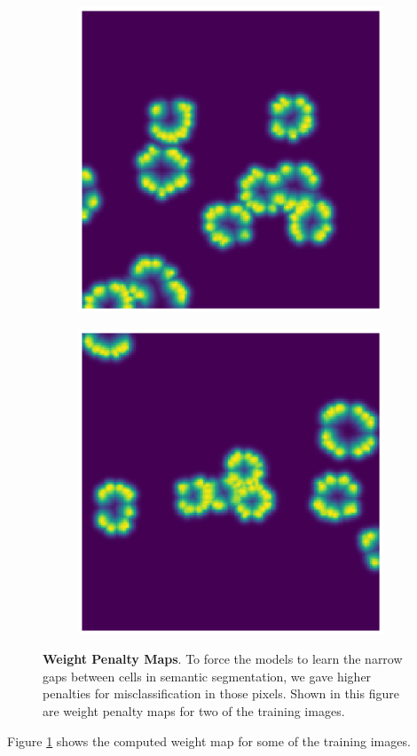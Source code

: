 \documentclass[10pt, journal, compsoc]{IEEEtran}
\begin{document}
\begin{figure}
\begin{subfigure}[b]{0.45\linewidth}
\end{subfigure}
\begin{subfigure}[b]{0.45\linewidth}
\includegraphics[width=\linewidth]{weights/108641-wmap.eps}
\end{subfigure}
\begin{subfigure}[b]{0.45\linewidth}
\includegraphics[width=\linewidth]{weights/108681-wmap.eps}
\end{subfigure}
\caption{\textbf{Weight Penalty Maps}. To force the models to learn the narrow gaps between cells in semantic segmentation, we gave higher penalties for misclassification in those pixels. Shown in this figure are weight penalty maps for two of the training images.}
\label{fig:weight_map}
\end{figure}
Figure \ref{fig:weight_map} shows the computed weight map for some of the training images.
\end{document}
